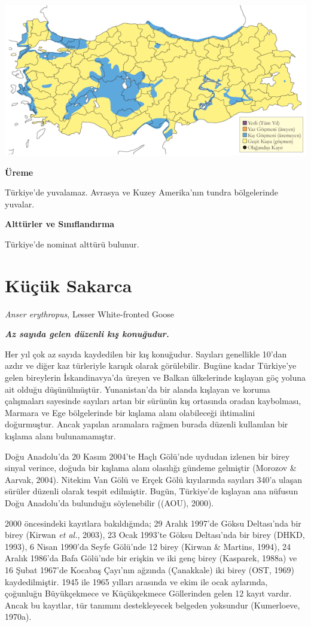 \documentclass[
  a4paper,
  DIV=11,
  numbers=noendperiod]{scrreprt}
\begin{document}
\includegraphics{images/harita_Page_003.png}

\textbf{Üreme}

Türkiye'de yuvalamaz. Avrasya ve Kuzey Amerika'nın tundra bölgelerinde
yuvalar.

\textbf{Alttürler ve Sınıflandırma}

Türkiye'de nominat alttürü bulunur.

\section{Küçük Sakarca}\label{kuxfcuxe7uxfck-sakarca}

\emph{Anser erythropus}, Lesser White-fronted Goose

\textbf{\emph{Az sayıda gelen düzenli kış konuğudur.}}

Her yıl çok az sayıda kaydedilen bir kış konuğudur. Sayıları genellikle
10'dan azdır ve diğer kaz türleriyle karışık olarak görülebilir. Bugüne
kadar Türkiye'ye gelen bireylerin İskandinavya'da üreyen ve Balkan
ülkelerinde kışlayan göç yoluna ait olduğu düşünülmüştür. Yunanistan'da
bir alanda kışlayan ve koruma çalışmaları sayesinde sayıları artan bir
sürünün kış ortasında oradan kaybolması, Marmara ve Ege bölgelerinde bir
kışlama alanı olabileceği ihtimalini doğurmuştur. Ancak yapılan
aramalara rağmen burada düzenli kullanılan bir kışlama alanı
bulunamamıştır.

Doğu Anadolu'da 20 Kasım 2004'te Haçlı Gölü'nde uydudan izlenen bir
birey sinyal verince, doğuda bir kışlama alanı olasılığı gündeme
gelmiştir (Morozov \& Aarvak, 2004). Nitekim Van Gölü ve Erçek Gölü
kıyılarında sayıları 340'a ulaşan sürüler düzenli olarak tespit
edilmiştir. Bugün, Türkiye'de kışlayan ana nüfusun Doğu Anadolu'da
bulunduğu söylenebilir ((AOU), 2000).

2000 öncesindeki kayıtlara bakıldığında; 29 Aralık 1997'de Göksu
Deltası'nda bir birey (Kirwan \emph{et al.}, 2003), 23 Ocak 1993'te
Göksu Deltası'nda bir birey (DHKD, 1993), 6 Nisan 1990'da Seyfe Gölü'nde
12 birey (Kirwan \& Martins, 1994), 24 Aralık 1986'da Bafa Gölü'nde bir
erişkin ve iki genç birey (Kasparek, 1988a) ve 16 Şubat 1967'de Kocabaş
Çayı'nın ağzında (Çanakkale) iki birey (OST, 1969) kaydedilmiştir. 1945
ile 1965 yılları arasında ve ekim ile ocak aylarında, çoğunluğu
Büyükçekmece ve Küçükçekmece Göllerinden gelen 12 kayıt vardır. Ancak bu
kayıtlar, tür tanımını destekleyecek belgeden yoksundur (Kumerloeve,
1970a).
\end{document}
